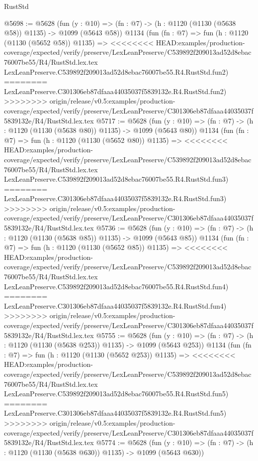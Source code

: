 \begin{lexlean}{RustStd}
\begin{coremodule}
{\begin{coremodule}
{{{{{{{{{{{@5698 := @5628
    (fun (y : @10) => (fn : @7) -> (h : @1120 (@1130 (@5638 @58)) @1135) -> @1099 (@5643 @58))
    @1134
    (fun (fn : @7) =>
    fun (h : @1120 (@1130 (@5652 @58)) @1135) =>
<<<<<<<< HEAD:examples/production-coverage/expected/verify/preserve/LexLeanPreserve/C539892f209013ad52d8ebac76007be55/R4/RustStd.lex.tex
    LexLeanPreserve.C539892f209013ad52d8ebac76007be55.R4.RustStd.fun2)
========
    LexLeanPreserve.C301306eb87dfaaa44035037f5839132e.R4.RustStd.fun2)
>>>>>>>> origin/release/v0.5:examples/production-coverage/expected/verify/preserve/LexLeanPreserve/C301306eb87dfaaa44035037f5839132e/R4/RustStd.lex.tex
@5717 := @5628
    (fun (y : @10) => (fn : @7) -> (h : @1120 (@1130 (@5638 @80)) @1135) -> @1099 (@5643 @80))
    @1134
    (fun (fn : @7) =>
    fun (h : @1120 (@1130 (@5652 @80)) @1135) =>
<<<<<<<< HEAD:examples/production-coverage/expected/verify/preserve/LexLeanPreserve/C539892f209013ad52d8ebac76007be55/R4/RustStd.lex.tex
    LexLeanPreserve.C539892f209013ad52d8ebac76007be55.R4.RustStd.fun3)
========
    LexLeanPreserve.C301306eb87dfaaa44035037f5839132e.R4.RustStd.fun3)
>>>>>>>> origin/release/v0.5:examples/production-coverage/expected/verify/preserve/LexLeanPreserve/C301306eb87dfaaa44035037f5839132e/R4/RustStd.lex.tex
@5736 := @5628
    (fun (y : @10) => (fn : @7) -> (h : @1120 (@1130 (@5638 @85)) @1135) -> @1099 (@5643 @85))
    @1134
    (fun (fn : @7) =>
    fun (h : @1120 (@1130 (@5652 @85)) @1135) =>
<<<<<<<< HEAD:examples/production-coverage/expected/verify/preserve/LexLeanPreserve/C539892f209013ad52d8ebac76007be55/R4/RustStd.lex.tex
    LexLeanPreserve.C539892f209013ad52d8ebac76007be55.R4.RustStd.fun4)
========
    LexLeanPreserve.C301306eb87dfaaa44035037f5839132e.R4.RustStd.fun4)
>>>>>>>> origin/release/v0.5:examples/production-coverage/expected/verify/preserve/LexLeanPreserve/C301306eb87dfaaa44035037f5839132e/R4/RustStd.lex.tex
@5755 := @5628
    (fun (y : @10) => (fn : @7) -> (h : @1120 (@1130 (@5638 @253)) @1135) -> @1099 (@5643 @253))
    @1134
    (fun (fn : @7) =>
    fun (h : @1120 (@1130 (@5652 @253)) @1135) =>
<<<<<<<< HEAD:examples/production-coverage/expected/verify/preserve/LexLeanPreserve/C539892f209013ad52d8ebac76007be55/R4/RustStd.lex.tex
    LexLeanPreserve.C539892f209013ad52d8ebac76007be55.R4.RustStd.fun5)
========
    LexLeanPreserve.C301306eb87dfaaa44035037f5839132e.R4.RustStd.fun5)
>>>>>>>> origin/release/v0.5:examples/production-coverage/expected/verify/preserve/LexLeanPreserve/C301306eb87dfaaa44035037f5839132e/R4/RustStd.lex.tex
@5774 := @5628
    (fun (y : @10) => (fn : @7) -> (h : @1120 (@1130 (@5638 @630)) @1135) -> @1099 (@5643 @630))
}}}}}}}}}}}
\end{coremodule}}
\end{coremodule}
\end{lexlean}
